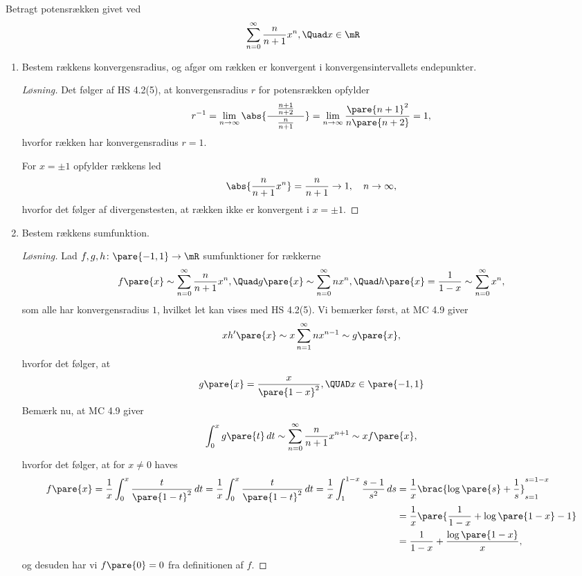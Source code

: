 \begin{opg}
Betragt potensrækken givet ved
$$ \sum_{n=0}^\infty \frac{n}{n+1}x^n, \Quad x\in\mR $$
\begin{enumerate}
    \item Bestem rækkens konvergensradius, og afgør om rækken er konvergent i konvergensintervallets endepunkter.
    
    
    \begin{proof}[Løsning]
    Det følger af HS 4.2(5), at konvergensradius $r$ for potensrækken opfylder
    $$ r^{-1}
        = \lim_{n\to\infty} \abs{\frac{\quad\frac{n+1}{n+2}\quad}{\frac{n}{n+1}}}
        = \lim_{n\to\infty} \frac{\pare{n+1}^2}{n\pare{n+2}} = 1, $$
    hvorfor rækken har konvergensradius $r = 1$.
    
    For $x=\pm 1$ opfylder rækkens led
    $$ \abs{\frac{n}{n+1}x^n} = \frac{n}{n+1} \to 1, \quad n\to\infty, $$
    hvorfor det følger af divergenstesten, at rækken ikke er konvergent i $x=\pm1$. 
    \end{proof}
    
    
    \item Bestem rækkens sumfunktion.
    
    
    \begin{proof}[Løsning]
    Lad $f,g,h\colon\pare{-1,1}\to\mR$ sumfunktioner for rækkerne
    $$ f\pare{x} \sim \sum_{n=0}^\infty \frac{n}{n+1}x^n,\Quad
        g\pare{x} \sim \sum_{n=0}^\infty nx^n, \Quad
        h\pare{x} = \frac{1}{1-x} \sim \sum_{n=0}^\infty x^n, $$
    som alle har konvergensradius $1$, hvilket let kan vises med HS 4.2(5). Vi bemærker først, at MC 4.9 giver
    $$ xh'\pare{x} \sim x\sum_{n=1}^\infty n x^{n-1} \sim g\pare{x}, $$
    hvorfor det følger, at
    $$ g\pare{x} = \frac{x}{\pare{1-x}^2}, \QUAD x\in\pare{-1,1} $$
    Bemærk nu, at MC 4.9 giver
    $$ \int_0^x g\pare{t} \, dt \sim \sum_{n=0}^\infty \frac{n}{n+1}x^{n+1}
        \sim xf\pare{x}, $$
    hvorfor det følger, at for $x\neq 0$ haves
    \begin{align*}
        f\pare{x} = \frac{1}{x}\int_0^x \frac{t}{\pare{1-t}^2} \, dt
                = \frac{1}{x}\int_0^x \frac{t}{\pare{1-t}^2} \, dt
                = \frac{1}{x}\int_1^{1-x} \frac{s-1}{s^2} \, ds
            &= \frac{1}{x}\brac{\log\pare{s} + \frac{1}{s}}_{s = 1}^{s = 1-x} \\
            &= \frac{1}{x}\pare{\frac{1}{1-x} + \log\pare{1-x} - 1} \\
            &= \frac{1}{1-x} + \frac{\log\pare{1-x}}{x},
    \end{align*}
    og desuden har vi $f\pare{0} = 0$ fra definitionen af $f$.
    \end{proof}
    
\end{enumerate}
\end{opg}

